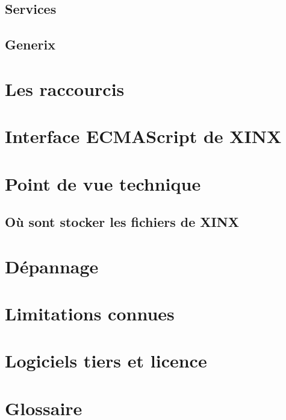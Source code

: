 \documentclass[a4paper,10pt,twoside]{book}
\begin{document}
\section{Services}
\label{sec:Services}

\section{Generix}
\label{sec:Generix}

\appendix
\chapter{Les raccourcis}

\chapter{Interface ECMAScript de XINX}

\chapter{Point de vue technique}

\section{Où sont stocker les fichiers de XINX}

\chapter{Dépannage}

\chapter{Limitations connues}

\chapter{Logiciels tiers et licence}

\chapter{Glossaire}
\end{document}
